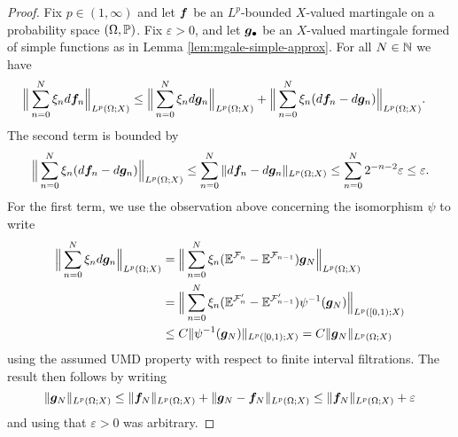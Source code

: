 \begin{proof}
  Fix $p \in (1,\infty)$ and let $\mb{f}$ be an $L^p$-bounded $X$-valued martingale on a probability space $(\Omega,\P)$.
  Fix $\varepsilon > 0$, and let $\mb{g}_{\bullet}$ be an $X$-valued martingale formed of simple functions as in Lemma \ref{lem:mgale-simple-approx}.
  For all $N \in \N$ we have
  \begin{equation*}
    \begin{aligned}
      \Big\| \sum_{n=0}^{N} \xi_{n} d\mb{f}_{n} \Big\|_{L^p(\Omega;X)}
      &\leq \Big\| \sum_{n=0}^{N} \xi_{n} d\mb{g}_{n} \Big\|_{L^p(\Omega;X)} + \Big\| \sum_{n=0}^{N} \xi_{n} (d\mb{f}_{n} - d\mb{g}_{n}) \Big\|_{L^p(\Omega;X)}.
    \end{aligned}
  \end{equation*}
  The second term is bounded by
  \begin{equation*}
    \Big\| \sum_{n=0}^{N} \xi_{n} (d\mb{f}_{n} - d\mb{g}_{n}) \Big\|_{L^p(\Omega;X)}
    \leq \sum_{n=0}^{N} \|d\mb{f}_{n} - d\mb{g}_{n}\|_{L^p(\Omega;X)} \leq \sum_{n=0}^{N}2^{-n-2}\varepsilon \leq \varepsilon.
  \end{equation*}
  For the first term, we use the observation above concerning the isomorphism $\psi$ to write
  \begin{equation*}
    \begin{aligned}
      \Big\| \sum_{n=0}^{N} \xi_{n} d\mb{g}_{n} \Big\|_{L^p(\Omega;X)}
      &= \Big\| \sum_{n=0}^{N} \xi_{n} (\E^{\mc{F}_{n}} - \E^{\mc{F}_{n-1}}) \mb{g}_{N} \Big\|_{L^p(\Omega;X)} \\
      &= \Big\| \sum_{n=0}^{N} \xi_{n} (\E^{\mc{F}'_{n}} - \E^{\mc{F}'_{n-1}}) \psi^{-1}(\mb{g}_{N}) \Big\|_{L^p([0,1);X)} \\
      &\leq C \| \psi^{-1}(\mb{g}_{N}) \|_{L^p([0,1);X)} 
      = C \|\mb{g}_{N}\|_{L^p(\Omega;X)}
    \end{aligned}
  \end{equation*}
  using the assumed UMD property with respect to finite interval filtrations.
  The result then follows by writing
  \begin{equation*}
    \|\mb{g}_{N}\|_{L^p(\Omega;X)} \leq \|\mb{f}_{N}\|_{L^p(\Omega;X)} + \|\mb{g}_{N} - \mb{f}_{N}\|_{L^p(\Omega;X)}
    \leq \|\mb{f}_{N}\|_{L^p(\Omega;X)} + \varepsilon
  \end{equation*}
  and using that $\varepsilon > 0$ was arbitrary.
\end{proof}

